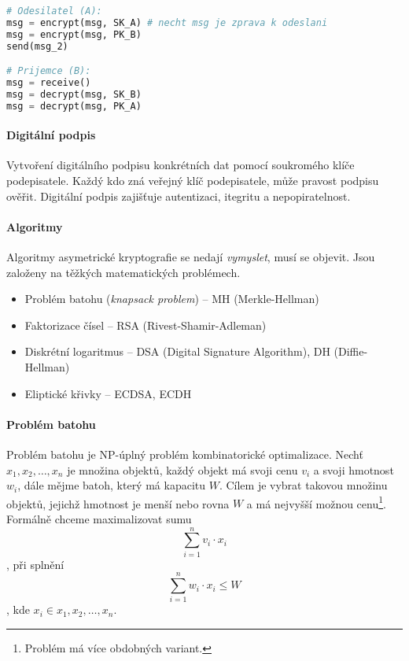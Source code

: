 \bigskip\noindent\begin{minipage}{\linewidth}
\begin{lstlisting}[language=Python, caption={Kombinace klíčů obou stran u asymetrický kryptografie. Pořadí operací může být i opačné.}]
# Odesilatel (A):
msg = encrypt(msg, SK_A) # necht msg je zprava k odeslani
msg = encrypt(msg, PK_B)
send(msg_2)

# Prijemce (B):
msg = receive()
msg = decrypt(msg, SK_B)
msg = decrypt(msg, PK_A)
\end{lstlisting}
\end{minipage}

\paragraph*{Digitální podpis} Vytvoření digitálního podpisu konkrétních dat pomocí soukromého klíče podepisatele. Každý kdo zná veřejný klíč podepisatele, může pravost podpisu ověřit. Digitální podpis zajišťuje autentizaci, itegritu a nepopiratelnost.

\paragraph*{Algoritmy} Algoritmy asymetrické kryptografie se nedají \textit{vymyslet}, musí se objevit. Jsou založeny na těžkých matematických problémech. \begin{itemize}
    \item Problém batohu (\textit{knapsack problem}) -- MH (Merkle-Hellman)
    \item Faktorizace čísel -- RSA (Rivest-Shamir-Adleman)
    \item Diskrétní logaritmus -- DSA (Digital Signature Algorithm), DH (Diffie-Hellman)
    \item Eliptické křivky -- ECDSA, ECDH
\end{itemize}

\paragraph*{Problém batohu} Problém batohu je NP-úplný problém kombinatorické optimalizace. Nechť ${x_1, x_2, \dots, x_n}$ je množina objektů, každý objekt má svoji cenu $v_i$ a svoji hmotnost $w_i$, dále mějme batoh, který má kapacitu $W$. Cílem je vybrat takovou množinu objektů, jejichž hmotnost je menší nebo rovna $W$ a má nejvyšší možnou cenu\footnote{Problém má více obdobných variant.}. Formálně chceme maximalizovat sumu $$ \sum_{i=1}^n v_i \cdot x_i $$, při splnění $$ \sum_{i=1}^n w_i \cdot x_i \leq W $$, kde $x_i \in {x_1, x_2, \dots, x_n}$.

